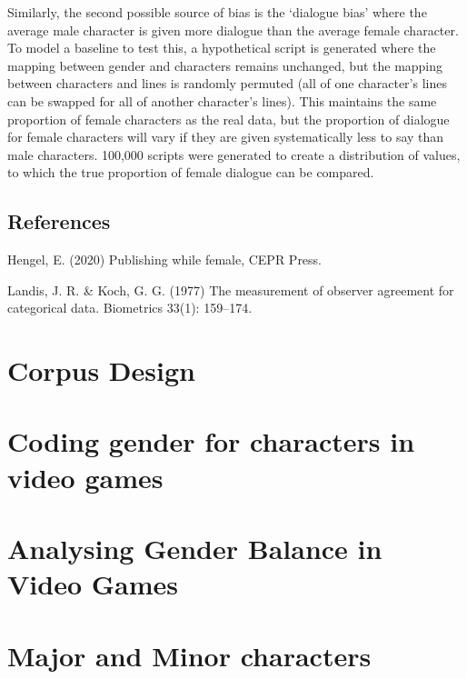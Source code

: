 \documentclass[12pt,a4paper]{article}
\newcommand{\includepdfPlus}[1]{}
\begin{document}
Similarly, the second possible source of bias is the `dialogue bias' where the average male character is given more dialogue than the average female character. To model a baseline to test this, a hypothetical script is generated where the mapping between gender and characters remains unchanged, but the mapping between characters and lines is randomly permuted (all of one character's lines can be swapped for all of another character's lines). This maintains the same proportion of female characters as the real data, but the proportion of dialogue for female characters will vary if they are given systematically less to say than male characters. 100,000 scripts were generated to create a distribution of values, to which the true proportion of female dialogue can be compared.

\subsection*{References}

Hengel, E. (2020) Publishing while female, CEPR Press.

Landis, J. R. \& Koch, G. G. (1977) The measurement of observer agreement for categorical data. Biometrics 33(1): 159–174.

\clearpage
\newpage
\section{Corpus Design}

\includepdfPlus{../../writeup/CorpusDescription.pdf}

\clearpage
\newpage

\section{Coding gender for characters in video games}

\includepdfPlus{../../writeup/CodingScheme.pdf}

\clearpage
\newpage

\section{Analysing Gender Balance in Video Games}

\includepdfPlus{../../analysis/Analyse_WordsPerGender.pdf}

\clearpage
\newpage
\section{Major and Minor characters}
\end{document}
